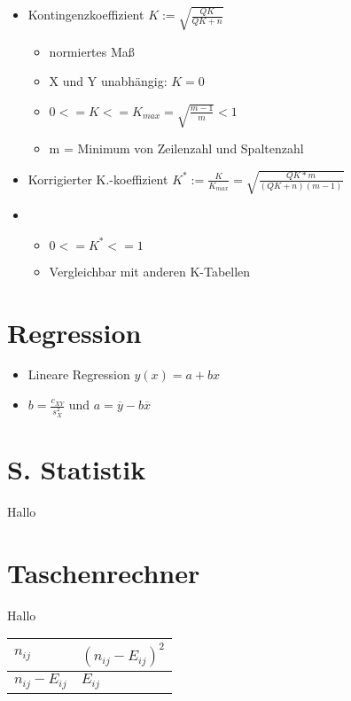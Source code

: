 \documentclass[a4paper]{article}
\begin{document}
\begin{landscape}
\begin{multicols}{4}
\begin{itemize}[noitemsep,nolistsep,leftmargin=*]
\begin{itemize}[noitemsep,nolistsep,leftmargin=*]
        \end{itemize}
        \item Kontingenzkoeffizient $K := \sqrt{\frac{QK}{QK+n}}$
        \begin{itemize}[noitemsep,nolistsep,leftmargin=*]
            \item normiertes Maß
            \item X und Y unabhängig: $K = 0$
            \item $0 <= K <= K_{max} = \sqrt{\frac{m-1}{m}} < 1$
            \item m = Minimum von Zeilenzahl und Spaltenzahl
        \end{itemize}
        \item Korrigierter K.-koeffizient $K^* := \frac{K}{K_{max}} = \sqrt{\frac{QK*m}{(QK+n)(m-1)}}$
        \item \begin{itemize}[noitemsep,nolistsep,leftmargin=*]
            \item $ 0 <= K^* <= 1$
            \item Vergleichbar mit anderen K-Tabellen
        \end{itemize}
    \end{itemize}


  




    \section{Regression}

    \begin{itemize}[noitemsep,nolistsep,leftmargin=*]
        \item Lineare Regression $y(x) = a +bx$
        \item $b = \frac{c_{XY}}{s_X^2}$ und $a = \overline{y} - b\overline{x}$
    \end{itemize}


    \section{S. Statistik}
    Hallo
    \section{Taschenrechner}
    Hallo
    
    \end{multicols}

    \begin{table}[]
        \begin{tabular}{l|l}
        $n_{ij}$ & $(n_{ij}-E_{ij})^2$           \\ \hline
        $n_{ij}-E_{ij}$           & $E_{ij}$
        \end{tabular}
        \end{table}
\end{landscape}
\end{document}
